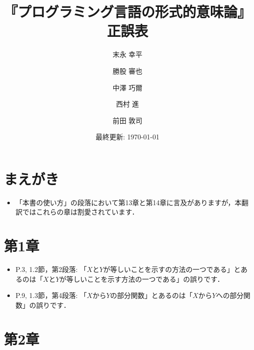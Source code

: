 \documentclass[12pt,titlepage,twoside,openright,dvipdfmx]{jsbook}
\title{『プログラミング言語の形式的意味論』正誤表}
\author{末永 幸平 \and 勝股 審也 \and 中澤 巧爾 \and 西村 進 \and 前田 敦司}
\date{最終更新: \today}
\theoremstyle{definition}
\begin{document}
\maketitle

\section*{まえがき}

\begin{itemize}
\item 「本書の使い方」の段落において第13章と第14章に言及がありますが，本翻訳ではこれらの章は割愛されています．
\end{itemize}

\section*{第1章}

\begin{itemize}
\item P.3, 1.2節，第2段落: 「$X$と$Y$が等しいことを示すの方法の一つである」とあるのは「$X$と$Y$が等しいことを示す方法の一つである」の誤りです．
\item P.9, 1.3節，第4段落: 「$X$から$Y$の部分関数」とあるのは「$X$から$Y$への部分関数」の誤りです．
\end{itemize}

\section*{第2章}
\end{document}
